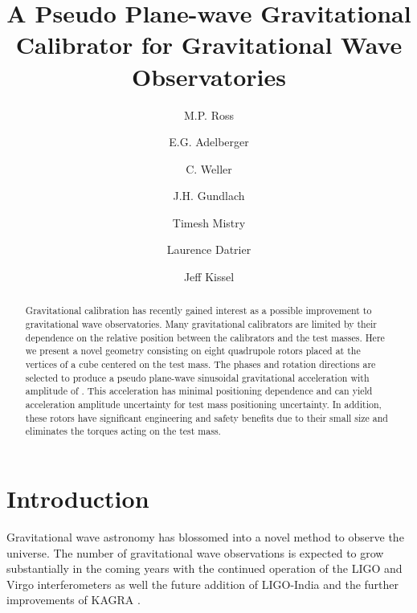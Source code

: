\documentclass[superscriptaddress, twocolumn, prd]{revtex4-1}
\begin{document}
\title{A Pseudo Plane-wave Gravitational Calibrator for Gravitational Wave Observatories}

\author{M.P. Ross}
\author{E.G. Adelberger}
\author{C. Weller}
\author{J.H. Gundlach}
\author{Timesh Mistry}
\author{Laurence Datrier}
\author{Jeff Kissel}


\begin{abstract}

Gravitational calibration has recently gained interest as a possible improvement to gravitational wave observatories. Many gravitational calibrators are limited by their dependence on the relative position between the calibrators and the test masses. Here we present a novel geometry consisting on eight quadrupole rotors placed at the vertices of a cube centered on the test mass. The phases and rotation directions are selected to produce a pseudo plane-wave  sinusoidal gravitational acceleration with amplitude of . This acceleration has minimal positioning dependence and can yield  acceleration amplitude uncertainty for \added{$\sim$1 cm} test mass positioning uncertainty. In addition, these rotors have significant engineering and safety benefits due to their small size and eliminates the torques acting on the test mass.

\end{abstract}

\maketitle

\section{Introduction}

Gravitational wave astronomy has blossomed into a novel method to observe the universe. The number of gravitational wave observations is expected to grow substantially in the coming years with the continued operation of the LIGO \cite{aLIGO} and Virgo \cite{virgo} interferometers as well the future addition of LIGO-India \cite{ligo-india} and the further improvements of KAGRA \cite{kagra}. 
\end{document}
